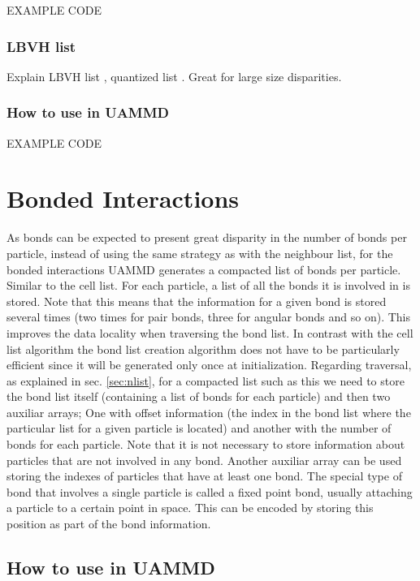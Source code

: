 \documentclass[ twoside,openright,titlepage,numbers=noenddot,%
headinclude,footinclude,cleardoublepage=empty,abstract=on,
BCOR=5mm,paper=a4,fontsize=11pt, dvipsnames
]{scrreprt}
\newcommand{\uammd}{\gls{UAMMD}\xspace}
\begin{document}
EXAMPLE CODE

\subsubsection{LBVH list}
Explain LBVH list \cite{lbvh}, quantized list \cite{quantizedlbvh}. Great for large size disparities.

\subsubsection{How to use in UAMMD}

EXAMPLE CODE

\section{Bonded Interactions}

As bonds can be expected to present great disparity in the number of bonds per particle, instead of using the same strategy as with the neighbour list, for the bonded interactions \uammd generates a compacted list of bonds per particle. Similar to the cell list.
For each particle, a list of all the bonds it is involved in is stored. Note that this means that the information for a given bond is stored several times (two times for pair bonds, three for angular bonds and so on).
This improves the data locality when traversing the bond list.
In contrast with the cell list algorithm the bond list creation algorithm does not have to be particularly efficient since it will be generated only once at initialization.
Regarding traversal, as explained in sec. \ref{sec:nlist}, for a compacted list such as this we need to store the bond list itself (containing a list of bonds for each particle) and then two auxiliar arrays; One with offset information (the index in the bond list where the particular list for a given particle is located) and another with the number of bonds for each particle.
Note that it is not necessary to store information about particles that are not involved in any bond. Another auxiliar array can be used storing the indexes of particles that have at least one bond.
The special type of bond that involves a single particle is called a fixed point bond, usually attaching a particle to a certain point in space. This can be encoded by storing this position as part of the bond information.

\subsection{How to use in UAMMD}
\end{document}
